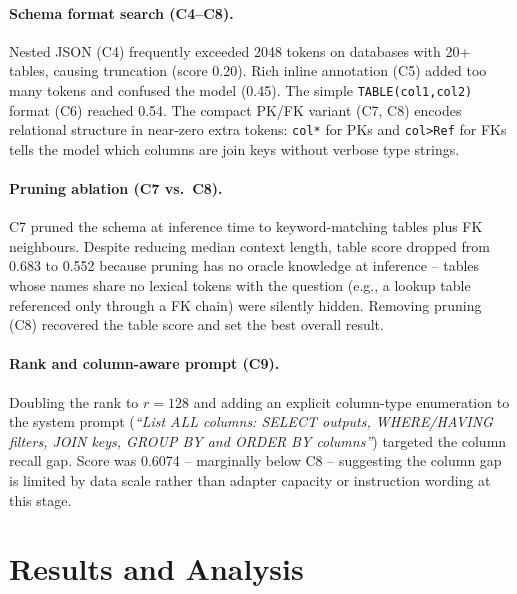 \documentclass[11pt]{article}
\begin{document}
\paragraph{Schema format search (C4--C8).}
Nested JSON (C4) frequently exceeded 2048 tokens on databases with 20+ tables, causing
truncation (score 0.20). Rich inline annotation (C5) added too many tokens and confused
the model (0.45). The simple \texttt{TABLE(col1,col2)} format (C6) reached 0.54.
The compact PK/FK variant (C7, C8) encodes relational structure in near-zero extra tokens:
\texttt{col*} for PKs and \texttt{col>Ref} for FKs tells the model which columns are join
keys without verbose type strings.

\paragraph{Pruning ablation (C7 vs.\ C8).}
C7 pruned the schema at inference time to keyword-matching tables plus FK neighbours.
Despite reducing median context length, table score dropped from 0.683 to 0.552 because
pruning has no oracle knowledge at inference -- tables whose names share no lexical tokens
with the question (e.g., a lookup table referenced only through a FK chain) were silently
hidden. Removing pruning (C8) recovered the table score and set the best overall result.

\paragraph{Rank and column-aware prompt (C9).}
Doubling the rank to $r=128$ and adding an explicit column-type enumeration to the system
prompt (\textit{``List ALL columns: SELECT outputs, WHERE/HAVING filters, JOIN keys, GROUP BY
and ORDER BY columns''}) targeted the column recall gap. Score was 0.6074 -- marginally
below C8 -- suggesting the column gap is limited by data scale rather than adapter capacity
or instruction wording at this stage.

\section{Results and Analysis}
\end{document}
